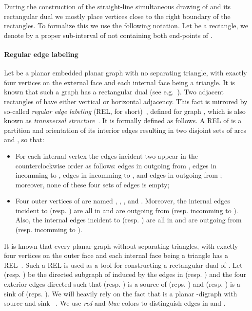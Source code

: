 \documentclass{llncs}
\begin{document}
During the construction of the straight-line simultaneous drawing of  and its rectangular dual  we mostly place vertices close to the right boundary of the rectangles. To formalize this we use the following notation. Let  be a rectangle, we denote by   a proper sub-interval of  not containing both end-points of .   


\paragraph{\bf Regular edge labeling}
Let  be a planar embedded planar graph with no separating triangle, with exactly four vertices on the external face and each internal face being a triangle. It is known that such a graph has a rectangular dual  (see e.g.~\cite{He93}). Two adjacent rectangles of  have either vertical or horizontal adjacency. This fact is mirrored by  so-called \emph{regular edge labeling} (REL, for short)~\cite{He93}, defined for graph , which is also known as \emph{transversal structure}~\cite{Fusy09}. It is formally defined as follows. A REL of  is a partition and orientation of its interior edges resulting in two disjoint sets of arcs  and , so that:
\begin{itemize}
\item For each internal vertex  the edges incident two  appear in the counterclockwise order as follows: edges in  outgoing from , edges in  incomming to , edges in  incomming to , and edges in  outgoing from ; moreover, none of these four sets of edges is empty;
\item Four outer vertices of  are named , , , and . Moreover, the internal edges incident to  (resp. ) are all in  and are outgoing from  (resp. incomming to ). Also, the internal edges incident to  (resp. ) are all in  and are outgoing from  (resp. incomming to  ).
\end{itemize}
It is known that every planar graph without separating triangles, with exactly four vertices on the outer face and each internal face being a triangle has a REL~\cite[Theorem~2.2]{He93}. Such a REL is used as a tool for constructing a rectangular dual of . Let  (resp. ) be the directed subgraph of  induced by the edges in  (resp. ) and the four exterior edges directed such that  (resp. ) is a source of  (reps. ) and  (resp. ) is  a sink of  (reps. ).  We will heavily rely on the fact that  is a planar -digraph with source   and sink ~\cite[Lemma 2.3]{He93}. We use \emph{red} and \emph{blue} colors to distinguish edges in  and . 
\end{document}

